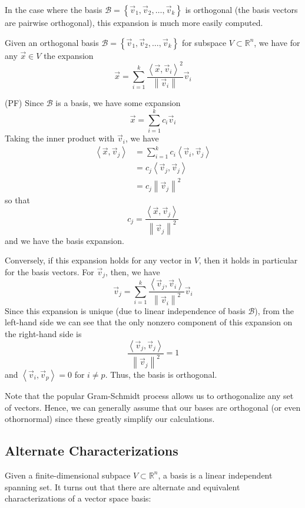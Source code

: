 In the case where the basis $\mathcal{B} = \left\{ \vec{v}_1, \vec{v}_2, \ldots, \vec{v}_k\right\}$ is orthogonal (the basis vectors are pairwise orthogonal), this expansion is much more easily computed. 

\begin{prop} 
Given an orthogonal basis $\mathcal{B} = \left\{ \vec{v}_1, \vec{v}_2, \ldots, \vec{v}_k\right\}$ for subspace $V \subset \mathbb{R}^n$, we have for any $\vec{x} \in V$ the expansion \[ \vec{x} = \sum_{i=1}^k \frac{\left\langle \vec{x}, \vec{v}_i \right\rangle^2 }{\left\lVert \vec{v}_i \right\rVert } \vec{v}_i \]
\end{prop}

(PF) Since $\mathcal{B}$ is a basis, we have some expansion \[ \vec{x} = \sum_{i=1}^k c_i \vec{v}_i \] Taking the inner product with $\vec{v}_i$, we have \[ \begin{split} \left\langle \vec{x}, \vec{v}_j\right\rangle & = \sum_{i=1}^k c_i\left\langle \vec{v}_i, \vec{v}_j \right\rangle \\ & = c_j \left\langle \vec{v}_j, \vec{v}_j \right\rangle \\ & = c_j \left\lVert \vec{v}_j \right\rVert^2  \end{split} \] so that \[ c_j = \frac{\left\langle \vec{x}, \vec{v}_j \right\rangle }{\left\lVert \vec{v}_j\right\rVert^2} \] and we have the basis expansion.

Conversely, if this expansion holds for any vector in $V$, then it holds in particular for the basis vectors. For $\vec{v}_j$, then, we have \[ \vec{v}_j = \sum_{i=1}^k \frac{\left\langle \vec{v}_j, \vec{v}_i \right\rangle }{ \left\lVert \vec{v}_i \right\rVert^2 } \vec{v}_i \] Since this expansion is unique (due to linear independence of basis $\mathcal{B}$), from the left-hand side we can see that the only nonzero component of this expansion on the right-hand side is \[ \frac{\left\langle  \vec{v}_j, \vec{v}_j \right\rangle}{\left\lVert \vec{v}_j \right\rVert^2} = 1 \] and $\left\langle \vec{v}_i, \vec{v}_p \right\rangle = 0$ for $i \neq p$. Thus, the basis is orthogonal.

Note that the popular Gram-Schmidt process allows us to orthogonalize any set of vectors. Hence, we can generally assume that our bases are orthogonal (or even othornormal) since these greatly simplify our calculations.





\subsection{Alternate Characterizations}
Given a finite-dimensional subpace $V \subset \mathbb{R}^n$, a basis is a linear independent spanning set. It turns out that there are alternate and equivalent characterizations of a vector space basis:

